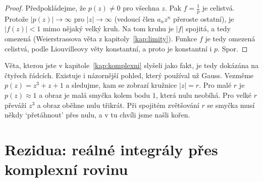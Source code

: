\begin{proof}
  Předpokládejme, že $p(z)\neq 0$ pro všechna $z$. Pak $f = \frac{1}{p}$ je celistvá. Protože $|p(z)|\to\infty$ pro $|z|\to\infty$ (vedoucí člen $a_nz^n$ přeroste ostatní), je $|f(z)| < 1$ mimo nějaký velký kruh. Na tom kruhu je $|f|$ spojitá, a tedy omezená (Weierstrassova věta z kapitoly~\ref{kap:limity}). Funkce $f$ je tedy omezená celistvá, podle Liouvilleovy věty konstantní, a proto je konstantní i $p$. Spor.
\end{proof}

Věta, kterou jste v kapitole~\ref{kap:komplexni} slyšeli jako fakt, je tedy dokázána na čtyřech řádcích. Existuje i názornější pohled, který používal už Gauss. Vezměme $p(z) = z^3 + z + 1$ a sledujme, kam se zobrazí kružnice $|z| = r$. Pro malé $r$ je $p(z)\approx 1$ a obraz je malá smyčka kolem bodu $1$, která nulu neobíhá. Pro velké $r$ převáží $z^3$ a obraz oběhne nulu třikrát. Při spojitém zvětšování $r$ se smyčka musí někdy `přetáhnout' přes nulu, a v tu chvíli jsme našli kořen.

\begin{center}
\end{center}

\section{Rezidua: reálné integrály přes komplexní rovinu}

